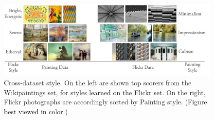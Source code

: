 \begin{figure}[ht]
\centering
\includegraphics[width=\linewidth]{../style/figures/style_by_style.pdf}
\caption[Cross-dataset understanding of style demonstrated by applying Wikipaintings-learned classifiers to phoitographs, and Flickr-learned classifiers to paintings.]{
    Cross-dataset style.
    On the left are shown top scorers from the Wikipaintings set, for styles learned on the Flickr set.
    On the right, Flickr photographs are accordingly sorted by Painting style.
    (Figure best viewed in color.)
}
\label{fig:photo_painting}
\end{figure}

